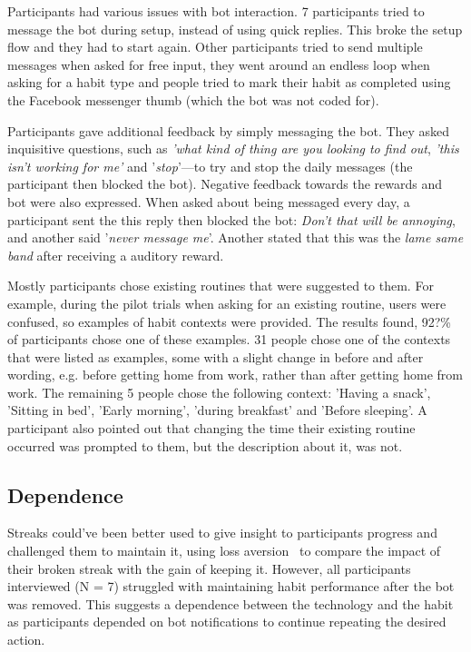 \documentclass{scaffold/sigchi}
\begin{document}
Participants had various issues with bot interaction. 7 participants tried to message the bot during setup, instead of using quick replies. This broke the setup flow and they had to start again. Other participants tried to send multiple messages when asked for free input, they went around an endless loop when asking for a habit type and people tried to mark their habit as completed using the Facebook messenger thumb (which the bot was not coded for).

Participants gave additional feedback by simply messaging the bot. They asked inquisitive questions, such as \textit{'what kind of thing are you looking to find out}, \textit{'this isn't working for me'} and '\textit{stop}'---to try and stop the daily messages (the participant then blocked the bot). Negative feedback towards the rewards and bot were also expressed. When asked about being messaged every day, a participant sent the this reply then blocked the bot: \textit{Don't that will be annoying}, and another said '\textit{never message me}'. Another stated that this was the \textit{lame same band} after receiving a auditory reward.

Mostly participants chose existing routines that were suggested to them. For example, during the pilot trials when asking for an existing routine, users were confused, so examples of habit contexts were provided. The results found, 92?\% of participants chose one of these examples. 31 people chose one of the contexts that were listed as examples, some with a slight change in before and after wording, e.g. before getting home from work, rather than after getting home from work. The remaining 5 people chose the following context: 'Having a snack', 'Sitting in bed', 'Early morning', 'during breakfast' and 'Before sleeping'. A participant also pointed out that changing the time their existing routine occurred was prompted to them, but the description about it, was not.


\subsection{Dependence}
Streaks could've been better used to give insight to participants progress and challenged them to maintain it, using loss aversion~\cite{loss_aversion} to compare the impact of their broken streak with the gain of keeping it. However, all participants interviewed (N = 7) struggled with maintaining habit performance after the bot was removed. This suggests a dependence between the technology and the habit as participants depended on bot notifications to continue repeating the desired action.
\end{document}
